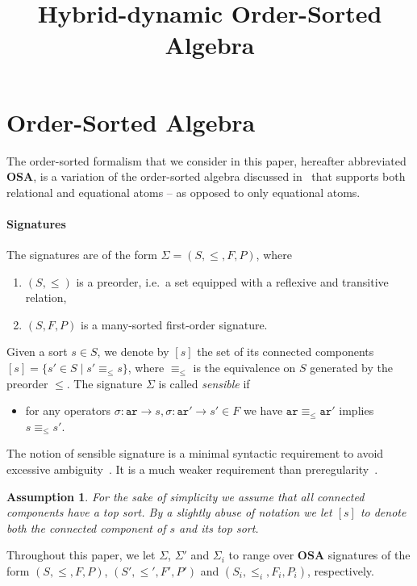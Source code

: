 \documentclass{article}
\date{}
\title{Hybrid-dynamic Order-Sorted Algebra}
\author{}
\newtheorem{assumption}{Assumption}
\newcommand{\OSA}{{\mathbf{OSA}}}
\newcommand{\ari}{\mathtt{ar}}
\begin{document}
\maketitle

\section{Order-Sorted Algebra}

The order-sorted formalism that we consider in this paper, hereafter abbreviated $\OSA$, is a variation of the order-sorted algebra discussed in~\cite{Meseguer97} that supports both relational and equational atoms -- as opposed to only equational atoms.

\paragraph{Signatures}
The signatures are of the form \(\Sigma = (S, \leq, F, P)\), where 
\begin{enumerate}[label=\alph*)]

\item \((S, \leq)\) is a preorder, i.e.\ a set equipped with a reflexive and transitive relation, 

\item \((S, F, P)\) is a many-sorted first-order signature.

\end{enumerate}
Given a sort \(s \in S\), we denote by \([s]\) the set of its connected components $[s]=\{s'\in S\mid s'\equiv_\leq s\}$, where $\equiv_\leq$ is the equivalence on $S$ generated by the preorder $\leq$.
The signature $\Sigma$ is called \emph{sensible} if 
\begin{itemize}[nosep, leftmargin=1em]
\item for any operators $\sigma:\ari\to s,\sigma:\ari'\to s'\in F$ we have $\ari\equiv_\leq\ari'$ implies $s\equiv_\leq s'$.
\end{itemize}
The notion of sensible signature is a minimal syntactic requirement to avoid excessive ambiguity~\cite{Meseguer97}.
It is a much weaker requirement than preregularity~\cite{GoguenM92}.

\begin{assumption}
	For the sake of simplicity we assume that all connected components have a top sort.
By a slightly abuse of notation we let $[s]$ to denote both the connected component of $s$ and its top sort.
\end{assumption}
Throughout this paper, we let $\Sigma$, $\Sigma'$ and $\Sigma_i$ to range over $\OSA$ signatures of the form $(S,\leq,F,P)$, $(S',\leq',F',P')$ and $(S_i,\leq_i,F_i,P_i)$, respectively.
\end{document}
